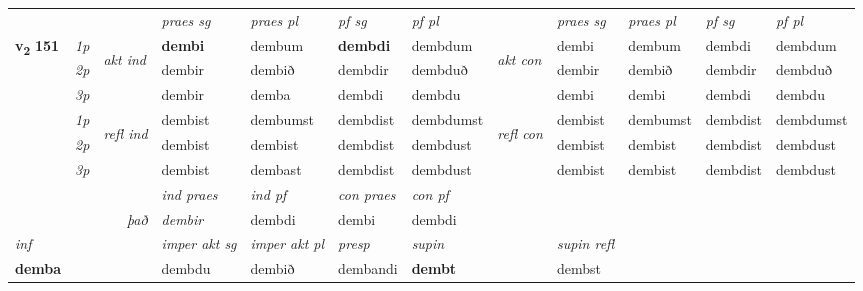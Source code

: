 \begin{longtable}[l]{X>{\footnotesize\itshape}llXXXXlXXXX}
 & &   & \textit{praes sg}  & \textit{praes pl}    & \textit{ pf sg} & \textit{pf pl} & & \textit{praes sg}  & \textit{praes pl}    & \textit{pf sg} & \textit{pf pl }  \\ \cmidrule{4-7} \cmidrule{9-12}
 \multirow{2}{*}{{{\textbf{v{\textsubscript{2}}} \Large{\textbf{151}}}}}  & 1p & \multirow{3}{*}{\begin{turn}{90}\textit{akt ind}\end{turn}} & \textbf{dembi} & dembum & \textbf{dembdi} & dembdum & \multirow{3}{*}{\begin{turn}{90}\textit{akt con}\end{turn}} &dembi & dembum & dembdi & dembdum\\*
 & 2p &  &  dembir  & dembið & dembdir & dembduð & & dembir & dembið & dembdir & dembduð \\*
 & 3p &  & dembir & demba & dembdi & dembdu & & dembi & dembi& dembdi & dembdu \\*
\cmidrule{4-7} \cmidrule{9-12}
 & 1p & \multirow{3}{*}{\begin{turn}{90}\textit{refl ind}\end{turn}}  & dembist & dembumst & dembdist & dembdumst & \multirow{3}{*}{\begin{turn}{90}\textit{refl con}\end{turn}}  &dembist & dembumst & dembdist & dembdumst \\*
 & 2p &  & dembist & dembist & dembdist & dembdust & &dembist & dembist & dembdist & dembdust \\*
 & 3p  & & dembist & dembast & dembdist & dembdust & & dembist & dembist& dembdist & dembdust \\*
\cmidrule{4-7} \cmidrule{9-12}

   && &  \textit{ind praes} & \textit{ind pf} & \textit{con praes} & \textit{con pf} \\*
\multicolumn{3}{r}{\textit{það}} & dembir & dembdi & dembi & dembdi \\*

\cmidrule{4-7}
   {\textit{inf}} & &  & \textit{imper akt sg} & \textit{imper akt pl}   & \textit{presp} & \textit{supin} && \textit{supin refl}  \\*
  {\textbf{demba}} & && dembdu  & dembið   & dembandi &  \textbf{dembt} && dembst  \\*

\midrule


\end{longtable}
